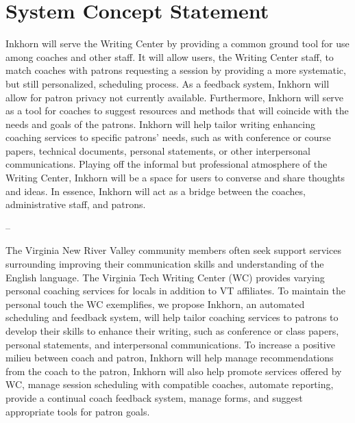 \documentclass[12pt]{article} %
\begin{document}
\newpage
\section{System Concept Statement} %


Inkhorn will serve the Writing Center by providing a common ground tool for use among coaches and other staff.
It will allow users, the Writing Center staff, to match coaches with patrons requesting a session by providing a more systematic, but still personalized, scheduling process.
As a feedback system, Inkhorn will allow for patron privacy not currently available.
Furthermore, Inkhorn will serve as a tool for coaches to suggest resources and methods that will coincide with the needs and goals of the patrons.
Inkhorn will help tailor writing enhancing coaching services to specific patrons’ needs, such as with conference or course papers, technical documents, personal statements, or other interpersonal communications.
Playing off the informal but professional atmosphere of the Writing Center, Inkhorn will be a space for users to converse and share thoughts and ideas.
In essence, Inkhorn will act as a bridge between the coaches, administrative staff, and patrons.

--

The Virginia New River Valley community members often seek support services surrounding improving their communication skills and understanding of the English language.
The Virginia Tech Writing Center (WC) provides varying personal coaching services for locals in addition to VT affiliates.
To maintain the personal touch the WC exemplifies, we propose Inkhorn, an automated scheduling and feedback system, will help tailor coaching services to patrons to develop their skills to enhance their writing, such as conference or class papers, personal statements, and interpersonal communications. 
To increase a positive milieu between coach and patron, Inkhorn will help manage recommendations from the coach to the patron, 
Inkhorn will also help promote services offered by WC, manage session scheduling with compatible coaches, automate reporting, provide a continual coach feedback system, manage forms, and suggest appropriate tools for patron goals.
\end{document}
